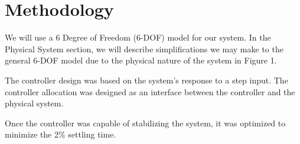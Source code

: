 \section*{Methodology}

We will use a 6 Degree of Freedom (6-DOF) model for our system. In the Physical System section, we will describe simplifications we may make to the general 6-DOF model due to the physical nature of the system in Figure 1.

The controller design was based on the system's response to a step input. The controller allocation was designed as an interface between the controller and the physical system.

Once the controller was capable of stabilizing the system, it was optimized to minimize the 2\% settling time.